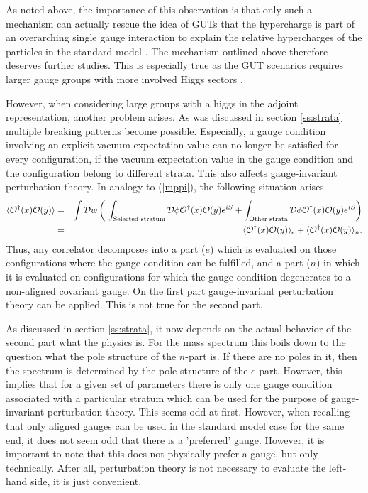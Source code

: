 \documentclass[final,12pt,3p,longtitle]{elsarticle}
\newcommand*{\no}{\noindent}
\newcommand*{\bea}{\begin{eqnarray}}
\newcommand*{\eea}{\end{eqnarray}}
\newcommand*{\pref}[1]{(\ref{#1})}
\newcommand*{\nn}{\nonumber}
\newcommand*{\1}{1\!\!\!\bot}
\newcommand*{\op}{{\cal O}}
\begin{document}
As noted above, the importance of this observation is that only such a mechanism can actually rescue the idea of GUTs that the hypercharge is part of an overarching single gauge interaction to explain the relative hypercharges of the particles in the standard model \cite{Langacker:1980js}. The mechanism outlined above therefore deserves further studies. This is especially true as the GUT scenarios requires larger gauge groups with more involved Higgs sectors \cite{Langacker:1980js}.

However, when considering large groups with a higgs in the adjoint representation, another problem arises. As was discussed in section \ref{ss:strata} multiple breaking patterns become possible. Especially, a gauge condition involving an explicit vacuum expectation value can no longer be satisfied for every configuration, if the vacuum expectation value in the gauge condition and the configuration belong to different strata. This also affects gauge-invariant perturbation theory. In analogy to \pref{mppi}, the following situation arises \cite{Maas:2017xzh}
\bea
\langle \op^\dagger(x) \op(y)\rangle&=&\int{\cal D}w\left(~\int_\text{Selected stratum}{\cal D}\phi \op^\dagger(x)\op(y)e^{iS}+\int_\text{Other strata}{\cal D}\phi\op^\dagger(x)\op(y)e^{iS}\right)\nonumber\\
&=&\langle \op^\dagger(x)\op(y)\rangle_e+\langle \op^\dagger(x) \op(y)\rangle_n\nn.
\eea
\no Thus, any correlator decomposes into a part ($e$) which is evaluated on those configurations where the gauge condition can be fulfilled, and a part ($n$) in which it is evaluated on configurations for which the gauge condition degenerates to a non-aligned covariant gauge. On the first part gauge-invariant perturbation theory can be applied. This is not true for the second part.

As discussed in section \ref{ss:strata}, it now depends on the actual behavior of the second part what the physics is. For the mass spectrum this boils down to the question what the pole structure of the $n$-part is. If there are no poles in it, then the spectrum is determined by the pole structure of the $e$-part. However, this implies that for a given set of parameters there is only one gauge condition associated with a particular stratum which can be used for the purpose of gauge-invariant perturbation theory. This seems odd at first. However, when recalling that only aligned gauges can be used in the standard model case for the same end, it does not seem odd that there is a 'preferred' gauge. However, it is important to note that this does not physically prefer a gauge, but only technically. After all, perturbation theory is not necessary to evaluate the left-hand side, it is just convenient.
\end{document}
